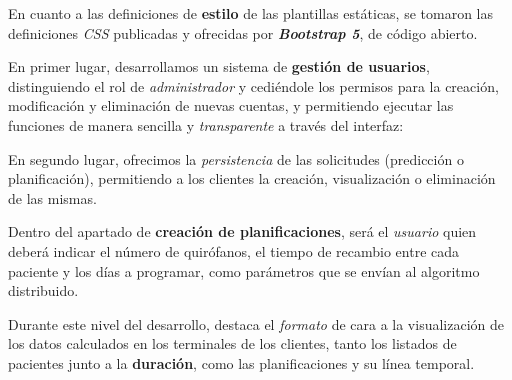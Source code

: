 En cuanto a las definiciones de \textbf{estilo} de las plantillas estáticas, se tomaron las definiciones \textit{CSS} publicadas y ofrecidas por \textit{\textbf{Bootstrap 5}}, de código abierto.

En primer lugar, desarrollamos un sistema de \textbf{gestión de usuarios}, distinguiendo el rol de \textit{administrador} y cediéndole los permisos para la creación, modificación y eliminación de nuevas cuentas, y permitiendo ejecutar las funciones de manera sencilla y \textit{transparente} a través del interfaz:


En segundo lugar, ofrecimos la \textit{persistencia} de las solicitudes (predicción o planificación), permitiendo a los clientes la creación, visualización o eliminación de las mismas.

Dentro del apartado de \textbf{creación de planificaciones}, será el \textit{usuario} quien deberá indicar el número de quirófanos, el tiempo de recambio entre cada paciente y los días a programar, como parámetros que se envían al algoritmo distribuido.

Durante este nivel del desarrollo, destaca el \textit{formato} de cara a la visualización de los datos calculados en los terminales de los clientes, tanto los listados de pacientes junto a la \textbf{duración}, como las planificaciones y su línea temporal.



